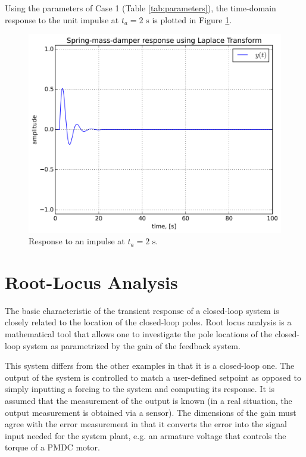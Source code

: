 \documentclass[10pt,letterpaper]{article}
\begin{document}
Using the parameters of Case 1 (Table \ref{tab:parameters}), the time-domain response to the unit impulse at $t_a=2\text{ s}$ is plotted in Figure \ref{fig:laplacesolution}.
\begin{figure}
	\centering
	\includegraphics[width=\textwidth, height=\textheight, keepaspectratio]{./laplacesolution.png}
	\caption{Response to an impulse at $t_a=2\text{ s}$.}
	\label{fig:laplacesolution}
\end{figure}

\section{Root-Locus Analysis}
The basic characteristic of the transient response of a closed-loop system is closely related to the location of the closed-loop poles.
Root locus analysis is a mathematical tool that allows one to investigate the pole locations of the closed-loop system as parametrized by the gain of the feedback system.

This system differs from the other examples in that it is a closed-loop one.
The output of the system is controlled to match a user-defined setpoint as opposed to simply inputting a forcing to the system and computing its response.
It is assumed that the measurement of the output is known (in a real situation, the output measurement is obtained via a sensor).
The dimensions of the gain must agree with the error measurement in that it converts the error into the signal input needed for the system plant, e.g. an armature voltage that controls the torque of a PMDC motor.
\end{document}
